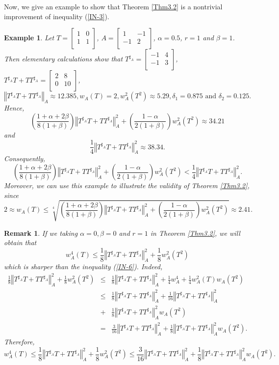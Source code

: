 \documentclass{article}
\newcommand{\bra}[1]{\left(#1\right)}
\newcommand{\normA}[1]{{\left\Vert#1\right\Vert}_{A}}
\newcommand {\Ta}{T^{\sharp_{A}}}
\newtheorem{example}[theorem]{Example}
\newtheorem{remark}[theorem]{Remark}
\begin{document}
Now, we give an example to show that Theorem \ref{Thm3.2} is a nontrivial improvement
of inequality (\ref{IN-3}).
\begin{example}Let $T=\begin{bmatrix} 1& 0 \\ 1 & 1 \\ \end{bmatrix}$, $A=\begin{bmatrix} 1 & -1 \\ -1 & 2 \\ \end{bmatrix}$,
$\alpha=0.5$, $r=1$ and $\beta=1$. Then elementary calculations show that
$\Ta=\begin{bmatrix} -1& 4 \\  -1&  3\\ \end{bmatrix}$, $\Ta T+T\Ta=\begin{bmatrix} 2& 8 \\  0&  10\\ \end{bmatrix}$,
$$\normA{\Ta T+T\Ta}\approx 12.385, w_A(T)=2, w_A^2(T^2)\approx 5.29, \delta_1=0.875\,\,\mbox{and}\,\, \delta_2=0.125.$$
  Hence,
  $$\bra{\frac{1+\alpha+2\beta}{8(1+\beta)}}\normA{\Ta T+T\Ta}^2+\bra{\frac{1-\alpha}{2(1+\beta)}}w_A^{2}(T^2)\approx 34.21$$
  and
  $$\frac{1}{4}\normA{\Ta T+T\Ta}^2\approx 38.34.$$
  Consequently,
  $$\bra{\frac{1+\alpha+2\beta}{8(1+\beta)}}\normA{\Ta T+T\Ta}^2+\bra{\frac{1-\alpha}{2(1+\beta)}}w_A^{2}(T^2)<\frac{1}{4}\normA{\Ta T+T\Ta}^2.$$
  Moreover, we can use this example to illustrate the validity of Theorem \ref{Thm3.2}, since
  $$2\approx w_A(T)\leq \sqrt[4]{\bra{\frac{1+\alpha+2\beta}{8(1+\beta)}}\normA{\Ta T+T\Ta}^2+\bra{\frac{1-\alpha}{2(1+\beta)}}w_A^{2}(T^2)}\approx
  2.41.$$
\end{example}
\begin{remark} If we taking $\alpha=0,\beta=0$ and $r=1$ in Theorem \ref{Thm3.2}, we will obtain that
$$w_A^{4}(T)\leq \frac{1}{8}\normA{\Ta T+T\Ta}^2+\frac{1}{8}w_A^2(T^2)$$
which is sharper than the inequality (\ref{IN-6}). Indeed,
\begin{eqnarray*}
  \frac{1}{8}\normA{\Ta T+T\Ta}^2+\frac{1}{8}w_A^2(T^2) &\leq& \frac{1}{8}\normA{\Ta T+T\Ta}^2+\frac{1}{4}w_A^4+\frac{1}{4}w_A^2(T)w_A(T^2)\\
   &\leq& \frac{1}{8}\normA{\Ta T+T\Ta}^2+\frac{1}{16}\normA{\Ta T+T\Ta}^2\\
   &+&\frac{1}{8}\normA{\Ta T+T\Ta}^2w_A(T^2)\\
   &=&\frac{3}{16}\normA{\Ta T+T\Ta}^2+\frac{1}{8}\normA{\Ta T+T\Ta}^2w_A(T^2).
\end{eqnarray*}
Therefore,
$$w_A^{4}(T)\leq \frac{1}{8}\normA{\Ta T+T\Ta}^2+\frac{1}{8}w_A^2(T^2)\leq \frac{3}{16}\normA{\Ta T+T\Ta}^2+\frac{1}{8}\normA{\Ta T+T\Ta}^2w_A(T^2).$$
\end{remark}
\end{document}
